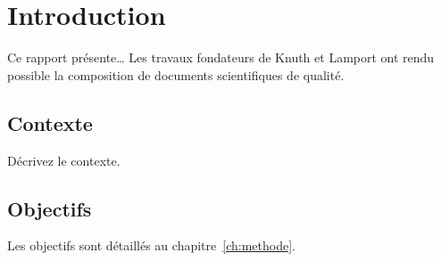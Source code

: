 \chapter{Introduction}
\label{ch:introduction}

Ce rapport présente… Les travaux fondateurs de Knuth \cite{knuth1984} et Lamport \cite{lamport1994} ont rendu possible la composition de documents scientifiques de qualité.

\section{Contexte}
Décrivez le contexte.

\section{Objectifs}
Les objectifs sont détaillés au chapitre~\ref{ch:methode}.
